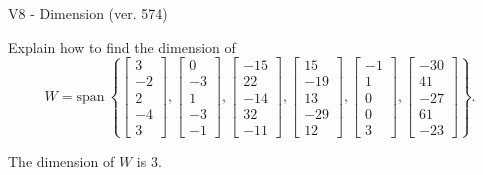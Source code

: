\begin{exercise}
  \begin{exerciseTitle}V8 - Dimension (ver. 574)\end{exerciseTitle}
  \begin{exerciseStatement}
    Explain how to find the dimension of 
\[W=\mathrm{span}\ \left\{\left[\begin{array}{r}
3 \\
-2 \\
2 \\
-4 \\
3
\end{array}\right] , \left[\begin{array}{r}
0 \\
-3 \\
1 \\
-3 \\
-1
\end{array}\right] , \left[\begin{array}{r}
-15 \\
22 \\
-14 \\
32 \\
-11
\end{array}\right] , \left[\begin{array}{r}
15 \\
-19 \\
13 \\
-29 \\
12
\end{array}\right] , \left[\begin{array}{r}
-1 \\
1 \\
0 \\
0 \\
3
\end{array}\right] , \left[\begin{array}{r}
-30 \\
41 \\
-27 \\
61 \\
-23
\end{array}\right]\right\}.\]



  \end{exerciseStatement}
  \begin{exerciseAnswer}
   The dimension of \(W\) is  \(3\).
  


  \end{exerciseAnswer}
\end{exercise}